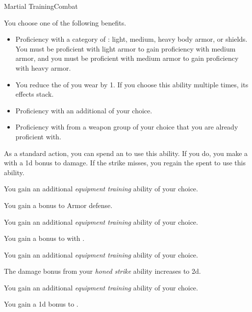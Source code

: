    \begin{feat}{Martial Training}{Combat}
        \featben

         You choose one of the following benefits.
        \begin{itemize}
            \item Proficiency with a category of : light, medium, heavy body armor, or shields.
                You must be proficient with light armor to gain proficiency with medium armor, and you must be proficient with medium armor to gain proficiency with heavy armor.
            \item You reduce the  of  you wear by 1.
                If you choose this ability multiple times, its effects stack.
            \item Proficiency with an additional  of your choice.
            \item Proficiency with  from a weapon group of your choice that you are already proficient with.
        \end{itemize}

         As a standard action, you can spend an  to use this ability.
        If you do, you make a  with a \plus1d bonus to damage.
        If the strike misses, you regain the  spent to use this ability.

         You gain an additional \textit{equipment training} ability of your choice.

         You gain a  bonus to Armor defense.

         You gain an additional \textit{equipment training} ability of your choice.

         You gain a  bonus to  with .

         You gain an additional \textit{equipment training} ability of your choice.

         The damage bonus from your \textit{honed strike} ability increases to \plus2d.

         You gain an additional \textit{equipment training} ability of your choice.

         You gain a \plus1d bonus to .
    \end{feat}


